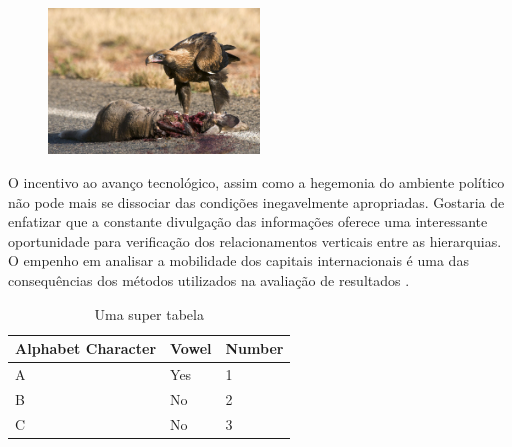 \documentclass[font=plain,chapter=TITLE,section=Title,espaco=duplo,tocpage=plain,appendix=Name,floatnumber=continuous]{abnt}
\begin{document}
%
%
%
%
\begin{figure}[h!]
  \centering
  \includegraphics[width=0.5\textwidth]{img/eagle.jpg}
\end{figure}

O incentivo ao avanço tecnológico, assim como a hegemonia do ambiente
político não pode mais se dissociar das condições inegavelmente
apropriadas. Gostaria de enfatizar que a constante divulgação das
informações oferece uma interessante oportunidade para verificação dos
relacionamentos verticais entre as hierarquias. O empenho em analisar a
mobilidade dos capitais internacionais é uma das consequências dos métodos
utilizados na avaliação de resultados \cite{semolini2002support}.

\begin{table}[h!b!p!]
\centering
\begin{tabular}{|l|l|l|}
\hline
Alphabet Character & Vowel & Number \\
\hline
A & Yes & 1 \\
B & No & 2 \\
C & No & 3 \\
\hline
\end{tabular}
\caption{Uma super tabela}
\label{tab:seila} %
\end{table}
\end{document}
